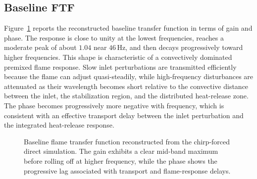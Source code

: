\documentclass{iopconfser}
\begin{document}
\subsection{Baseline FTF}
\label{subsec:baseline-ftf}

Figure~\ref{fig:baseline-ftf} reports the reconstructed baseline transfer function in terms of gain and phase. The response is close to unity at the lowest frequencies, reaches a moderate peak of about $1.04$ near $46\,\mathrm{Hz}$, and then decays progressively toward higher frequencies. This shape is characteristic of a convectively dominated premixed flame response. Slow inlet perturbations are transmitted efficiently because the flame can adjust quasi-steadily, while high-frequency disturbances are attenuated as their wavelength becomes short relative to the convective distance between the inlet, the stabilization region, and the distributed heat-release zone. The phase becomes progressively more negative with frequency, which is consistent with an effective transport delay between the inlet perturbation and the integrated heat-release response.

\begin{figure}[!htbp]
  \centering
  \caption{Baseline flame transfer function reconstructed from the chirp-forced direct simulation. The gain exhibits a clear mid-band maximum before rolling off at higher frequency, while the phase shows the progressive lag associated with transport and flame-response delays.}
  \label{fig:baseline-ftf}
\end{figure}
\FloatBarrier
\end{document}
